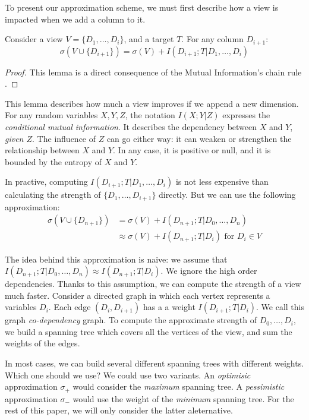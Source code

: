 To present our approximation scheme, we must first describe how a
view is impacted when we add a column to it.

\begin{lemma}\label{lem:chain}
Consider a view $V = \{D_1, \ldots, D_i\}$, and a target $T$.
For any column $D_{i+1}$: 
$$
\sigma(V \cup \{D_{i+1}\}) =  \sigma(V) + I(D_{i+1} ; T | D_1 , \ldots, D_i)
 $$
\end{lemma}
\begin{proof}
This lemma is a direct consequence of the Mutual Information's chain rule
\cite{cover2012elements}.
\end{proof}

This lemma describes how much a view improves if we append a new dimension.
For any random variables $X,Y,Z$, the notation $I(X;Y|Z)$ expresses the
\emph{conditional mutual information}. It describes the dependency between $X$
and $Y$, \emph{given $Z$}. The influence of $Z$ can go either way: it can
weaken or strengthen the relationship between $X$ and $Y$. In any case, it is
positive or null, and it is bounded by the entropy of $X$ and $Y$.

In practive, computing $ I(D_{i+1} ; T | D_1 , \ldots, D_i)$ is not less
expensive than calculating the strength of $\{D_1, \ldots, D_{i+1}\}$ directly.
But we can use the following approximation:
\[
\begin{split}
    \sigma(V \cup \{D_{n+1}\}) & = \sigma(V)   + I(D_{n+1} ; T | D_0, \ldots, D_{n})\\
                           & \approx \sigma(V) + I(D_{n+1} ; T | D_{i})
\text{ for } D_i \in V
\end{split}
\]

The idea behind this approximation is naive: we assume that $I(D_{n+1} ; T |
D_0, \ldots, D_{n}) \approx I(D_{n+1} ; T | D_{i})$. We ignore the high order
dependencies. Thanks to this assumption, we can compute the strength of a view
much faster.  Consider a directed graph in which each vertex represents a
variables $D_i$. Each edge $(D_i, D_{i+1})$ has a a weight $ I(D_{i+1} ; T |
D_{i})$.  We call this graph \emph{co-dependency} graph.  To compute the
approximate strength of ${D_0, \ldots, D_i}$, we build a spanning tree which
covers all the vertices of the view, and sum the weights of the edges.

In most cases, we can build several different spanning trees with different
weights. Which one should we use? We could use two variants. An
\emph{optimisic} approximation $\sigma_+ $ would consider the \emph{maximum}
spanning tree.  A \emph{pessimistic} approximation $\sigma_- $ would use the
weight of the \emph{minimum} spanning tree. For the rest of this paper, we will
only consider the latter aleternative. 

